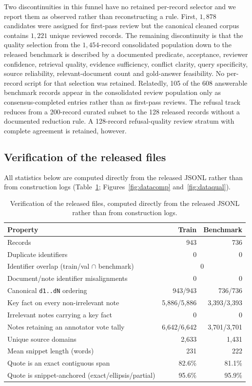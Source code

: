 Two discontinuities in this funnel have no retained per-record selector and we
report them as observed rather than reconstructing a rule. First, $1{,}878$
candidates were assigned for first-pass review but the canonical cleaned corpus
contains $1{,}221$ unique reviewed records. The remaining discontinuity is that the quality selection from
the $1{,}454$-record consolidated population down to the released benchmark is
described by a documented predicate, acceptance, reviewer confidence, retrieval
quality, evidence sufficiency, conflict clarity, query specificity, source
reliability, relevant-document count and gold-answer feasibility. No
per-record script for that selection was retained. Relatedly, 105 of the 608 answerable benchmark
records appear in the consolidated review population only as consensus-completed
entries rather than as first-pass reviews. The refusal track reduces from a
200-record curated subset to the 128 released records without a documented
reduction rule. A 128-record refusal-quality review stratum with complete
agreement is retained, however.

\subsection{Verification of the released files}

All statistics below are computed directly from the released JSONL rather than
from construction logs (Table~\ref{tab:relverif}; Figures~\ref{fig:datacomp}
and~\ref{fig:dataqual}).

\begin{table}[htbp]\centering\tabstyle
\begin{tabular*}{\linewidth}{@{\extracolsep{\fill}}lrr@{}}\toprule
\textbf{Property} & \textbf{Train} & \textbf{Benchmark}\\\midrule
Records & 943 & 736\\
Duplicate identifiers & 0 & 0\\
Identifier overlap (train/val $\cap$ benchmark) & \multicolumn{2}{c}{0}\\
Document/note identifier misalignments & 0 & 0\\
Canonical \texttt{d1..dN} ordering & 943/943 & 736/736\\
Key fact on every non-irrelevant note & 5{,}886/5{,}886 & 3{,}393/3{,}393\\
Irrelevant notes carrying a key fact & 0 & 0\\
Notes retaining an annotator vote tally & 6{,}642/6{,}642 & 3{,}701/3{,}701\\
Unique source domains & 2{,}633 & 1{,}431\\
Mean snippet length (words) & 231 & 222\\
Quote is an exact contiguous span & 82.6\% & 81.1\%\\
Quote is snippet-anchored (exact/ellipsis/partial) & 95.6\% & 95.9\%\\
\bottomrule\end{tabular*}
\caption{Verification of the released files, computed directly from the released
JSONL rather than from construction logs.}
\label{tab:relverif}
\end{table}

